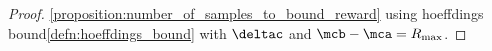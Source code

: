\begin{proofbox}\nospacing
  \begin{proof}\label{proof:proposition:number_of_samples_to_bound_reward}\cref{proposition:number_of_samples_to_bound_reward}
    using hoeffdings bound\cref{defn:hoeffdings_bound} with $\deltac$ and $\mcb-\mca=R_{\max}$.
  \end{proof}
\end{proofbox}
